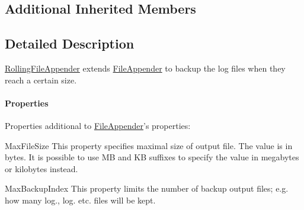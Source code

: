\subsection*{Additional Inherited Members}


\subsection{Detailed Description}
\hyperlink{classlog4cplus_1_1RollingFileAppender}{Rolling\-File\-Appender} extends \hyperlink{classlog4cplus_1_1FileAppender}{File\-Appender} to backup the log files when they reach a certain size.

\paragraph*{Properties}

Properties additional to \hyperlink{classlog4cplus_1_1FileAppender}{File\-Appender}'s properties\-:


\begin{DoxyDescription}
\item[{\ttfamily Max\-File\-Size} ]This property specifies maximal size of output file. The value is in bytes. It is possible to use {\ttfamily M\-B} and {\ttfamily K\-B} suffixes to specify the value in megabytes or kilobytes instead.


\item[{\ttfamily Max\-Backup\-Index} ]This property limits the number of backup output files; e.\-g. how many {\ttfamily log.}, {\ttfamily log.} etc. files will be kept. 
\end{DoxyDescription}

